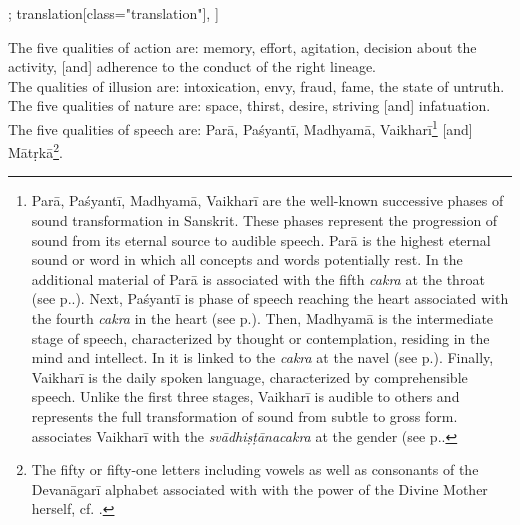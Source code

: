 \begin{alignment}[
  texts=edition[class="edition"];
  translation[class="translation"],
  ]
\begin{translation}
\begin{tlate}[p52_01]
The five qualities of action are: memory, effort, agitation, decision about the activity, [and] adherence to the conduct of the right lineage.\\

The qualities of illusion are: intoxication, envy, fraud, fame, the state of untruth.\\

The five qualities of nature are: space, thirst, desire, striving [and] infatuation.\\

The five qualities of speech are: Parā, Paśyantī, Madhyamā, Vaikharī\footnote{Parā, Paśyantī, Madhyamā, Vaikharī are the well-known successive phases of sound transformation in Sanskrit. These phases represent the progression of sound from its eternal source to audible speech. Parā is the highest eternal sound or word in which all concepts and words potentially rest. In the additional material of  Parā is associated with the fifth \textit{cakra} at the throat (see p.\pageref{cakra5}.). Next, Paśyantī is phase of speech reaching the heart associated with the fourth \textit{cakra} in the heart (see p.\pageref{cakra4}). Then, Madhyamā is the intermediate stage of speech, characterized by thought or contemplation, residing in the mind and intellect. In  it is linked to the \textit{cakra} at the navel (see p.\pageref{cakra3}). Finally, Vaikharī is the daily spoken language, characterized by comprehensible speech. Unlike the first three stages, Vaikharī is audible to others and represents the full transformation of sound from subtle to gross form.  associates Vaikharī with the \textit{svādhiṣṭānacakra} at the gender (see p.\pageref{cakra2}.} [and] Mātṛkā\footnote{The fifty or fifty-one letters including vowels as well as consonants of the Devanāgarī alphabet associated with with the power of the Divine Mother herself, cf. \citeauthor[24-28]{aryan}.}.
\flushpage
    \end{tlate}
  \end{translation}
\end{alignment}
\pagebreak %

